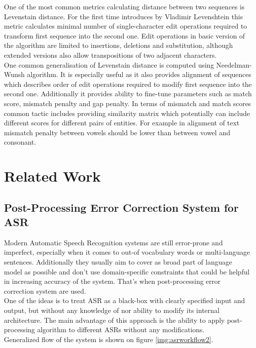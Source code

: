 \documentclass[a4paper,11pt,twoside]{report}
\theoremstyle{definition}
\begin{document}
One of the most common metrics calculating distance between two sequences is Levenstain distance. For the first time introduces by Vladimir Levenshtein this metric calculates minimal number of single-character edit operations required to transform first sequence into the second one. Edit operations in basic version of the algorithm are limited to insertions, deletions and substitution, although extended versions also allow transpositions of two adjacent characters.\\

One common generalisation of Levenstain distance is computed using Needelman-Wunsh algorithm. It is especially useful as it also provides alignment of sequences which describes order of edit operations required to modify first sequence into the second one. Additionally it provides ability to fine-tune parameters such as match score, mismatch penalty and gap penalty. In terms of mismatch and match scores common tactic includes providing similarity matrix which potentially can include different scores for different pairs of entities. For example in alignment of text mismatch penalty between vowels should be lower than between vowel and consonant.


\chapter{Related Work}

\section{Post-Processing Error Correction System for ASR}

Modern Automatic Speech Recognition systems are still error-prone and imperfect, especially when it comes to out-of vocabulary words or multi-language sentences. Additionally they usually aim to cover as broad part of language model as possible and don't use domain-specific constraints that could be helpful in increasing accuracy of the system. That's when post-processing error correction system are used. \\
One of the ideas is to treat ASR as a black-box \cite{ErrBlackBox} with clearly specified input and output, but without any knowledge of nor ability to modify its internal architecture. The main advantage of this approach is the ability to apply post-processing algorithm to different ASRs without any modifications. \\
Generalized flow of the system is shown on figure \ref{img:asrworkflow2}.
\end{document}
